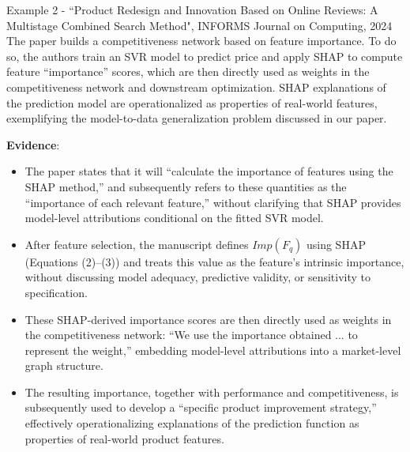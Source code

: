 \documentclass[11pt]{article}
\newcounter{se}[section]
\begin{document}
\begin{mainbox}{Example 2 - ``Product Redesign and Innovation Based on Online
Reviews: A Multistage Combined Search Method", INFORMS Journal on Computing, 2024} 
The paper builds a competitiveness network based on feature importance. To do so, the authors train an SVR model to predict price and apply SHAP to compute feature “importance” scores, which are then directly used as weights in the competitiveness network and downstream optimization. SHAP explanations of the prediction model are operationalized as properties of real-world features, exemplifying the model-to-data generalization problem discussed in our paper.
\vspace{0.2cm}

\textbf{Evidence}:
\begin{itemize}

\item The paper states that it will ``calculate the importance of features using the SHAP method,'' and subsequently refers to these quantities as the ``importance of each relevant feature,'' without clarifying that SHAP provides model-level attributions conditional on the fitted SVR model.

\item After feature selection, the manuscript defines $Imp(F_q)$ using SHAP (Equations (2)–(3)) and treats this value as the feature’s intrinsic importance, without discussing model adequacy, predictive validity, or sensitivity to specification.

\item These SHAP-derived importance scores are then directly used as weights in the competitiveness network: ``We use the importance obtained ... to represent the weight,'' embedding model-level attributions into a market-level graph structure.

\item The resulting importance, together with performance and competitiveness, is subsequently used to develop a ``specific product improvement strategy,'' effectively operationalizing explanations of the prediction function as properties of real-world product features.

\end{itemize}
\end{mainbox}

\vspace{0.5cm}
\end{document}
